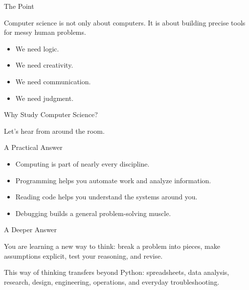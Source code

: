 \documentclass[aspectratio=169]{beamer}
\begin{document}
\begin{frame}{The Point}
  \begin{keyidea}
    Computer science is not only about computers. It is about building precise tools for messy human problems.
  \end{keyidea}
  \vspace{0.12in}
  \begin{itemize}
    \item We need logic.
    \item We need creativity.
    \item We need communication.
    \item We need judgment.
  \end{itemize}
\end{frame}


\begin{frame}{Why Study Computer Science?}
  \begin{center}
    {\Huge Let's hear from around the room.}
  \end{center}
\end{frame}

\begin{frame}{A Practical Answer}
  \begin{itemize}
    \item Computing is part of nearly every discipline.
    \item Programming helps you automate work and analyze information.
    \item Reading code helps you understand the systems around you.
    \item Debugging builds a general problem-solving muscle.
  \end{itemize}
\end{frame}

\begin{frame}{A Deeper Answer}
  \begin{keyidea}
    You are learning a new way to think: break a problem into pieces, make assumptions explicit, test your reasoning, and revise.
  \end{keyidea}
  \vspace{0.12in}
  \begin{exampleblockcp}
    This way of thinking transfers beyond Python: spreadsheets, data analysis, research, design, engineering, operations, and everyday troubleshooting.
  \end{exampleblockcp}
\end{frame}
\end{document}
